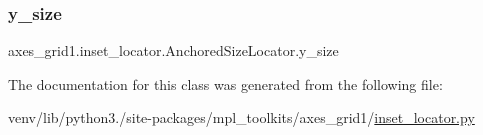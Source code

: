 \subsubsection{\texorpdfstring{y\+\_\+size}{y\_size}}
{\footnotesize\ttfamily axes\+\_\+grid1.\+inset\+\_\+locator.\+Anchored\+Size\+Locator.\+y\+\_\+size}



The documentation for this class was generated from the following file\+:\begin{DoxyCompactItemize}
\item 
venv/lib/python3./site-\/packages/mpl\+\_\+toolkits/axes\+\_\+grid1/\hyperlink{_2inset__locator_8py}{inset\+\_\+locator.\+py}\end{DoxyCompactItemize}

